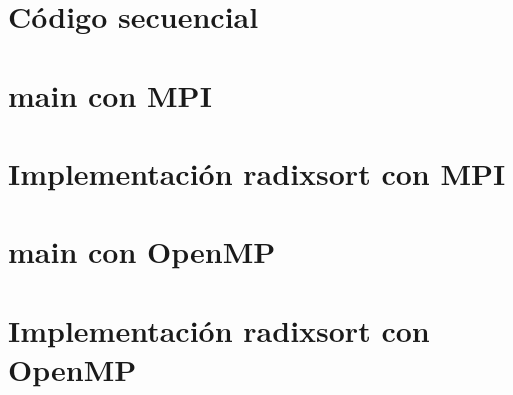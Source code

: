 \documentclass[a4paper]{article}
\begin{document}
\clearpage
\appendix

\section{Código secuencial}\label{secuencial.c}


\section{main con MPI}\label{main.c}


\section{Implementación radixsort con MPI}\label{radixsort_mpi.c}


\section{main con OpenMP}\label{main.c}


\section{Implementación radixsort con OpenMP}\label{radixsort_mpi.c}

\end{document}

